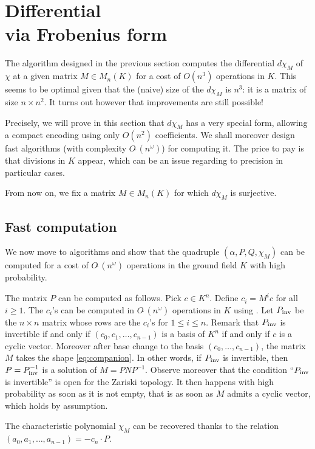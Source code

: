 \documentclass{sig-alternate-05-2015}
\newcommand{\softO}{O\tilde{~}}
\newcommand{\inv}{\text{\rm inv}}
\begin{document}
\section{Differential\\via Frobenius form}

The algorithm designed in the previous section computes the differential 
$d \chi_M$ of $\chi$ at a given matrix $M \in M_n(K)$ for a cost of 
$O(n^3)$ operations in $K$. This seems to be optimal given that the 
(naive) size of the $d \chi_M$ is $n^3$: it is a matrix of size $n
\times n^2$. It turns out however that improvements are still possible!

Precisely, we will prove in this section that $d \chi_M$ has a very 
special form, allowing a compact encoding using only $O(n^2)$ coefficients. 
We shall moreover design fast algorithms (with complexity $\softO
(n^\omega)$) for computing it. The price to pay is that divisions in
$K$ appear, which can be an issue regarding to precision in particular
cases.

From now on, we fix a matrix $M \in M_n(K)$ for which $d \chi_M$ is 
surjective.

\subsection{Fast computation}

We now move to algorithms and show that the quadruple $(\alpha, P, Q, 
\chi_M)$ can be computed for a cost of $\softO(n^\omega)$ operations
in the ground field $K$ with high probability.

The matrix $P$ can be computed as follows. Pick $c \in K^n$. Define 
$c_i = M^i c$ for all $i \geq 1$. The $c_i$'s can be computed in 
$\softO(n^\omega)$ operations in $K$ using \cite{}. Let $P_\inv$ be the 
$n \times n$ matrix whose rows are the $c_i$'s for $1 \leq i \leq n$. 
Remark that $P_\inv$ is invertible if and only if $(c_0, c_1, \ldots, 
c_{n-1})$ is a basis of $K^n$ if and only if $c$ is a cyclic vector. 
Moreover after base change to the basis $(c_0, \ldots, c_{n-1})$, the matrix 
$M$ takes the shape \eqref{eq:companion}. In other words, if $P_\inv$
is invertible, then $P = P_\inv^{-1}$ is a solution of $M = P N P^{-1}$.
Observe moreover that the condition ``$P_\inv$ is invertible'' is open
for the Zariski topology. It then happens with high probability as soon
as it is not empty, that is as soon as $M$ admits a cyclic vector, which
holds by assumption.

The characteristic polynomial $\chi_M$ can be recovered thanks to the
relation $(a_0, a_1, \ldots, a_{n-1}) = -c_n \cdot P$.
\end{document}
